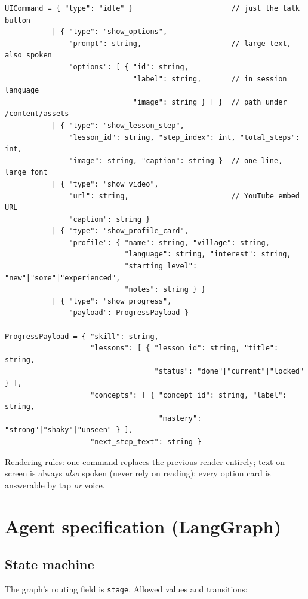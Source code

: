 \documentclass[11pt]{article}
\newcommand{\code}[1]{\texttt{#1}}
\begin{document}
\begin{verbatim}
UICommand = { "type": "idle" }                       // just the talk button
           | { "type": "show_options",
               "prompt": string,                     // large text, also spoken
               "options": [ { "id": string,
                              "label": string,       // in session language
                              "image": string } ] }  // path under /content/assets
           | { "type": "show_lesson_step",
               "lesson_id": string, "step_index": int, "total_steps": int,
               "image": string, "caption": string }  // one line, large font
           | { "type": "show_video",
               "url": string,                        // YouTube embed URL
               "caption": string }
           | { "type": "show_profile_card",
               "profile": { "name": string, "village": string,
                            "language": string, "interest": string,
                            "starting_level": "new"|"some"|"experienced",
                            "notes": string } }
           | { "type": "show_progress",
               "payload": ProgressPayload }

ProgressPayload = { "skill": string,
                    "lessons": [ { "lesson_id": string, "title": string,
                                   "status": "done"|"current"|"locked" } ],
                    "concepts": [ { "concept_id": string, "label": string,
                                    "mastery": "strong"|"shaky"|"unseen" } ],
                    "next_step_text": string }
\end{verbatim}

Rendering rules: one command replaces the previous render entirely; text on screen is always \emph{also} spoken (never rely on reading); every option card is answerable by tap \emph{or} voice.

\section{Agent specification (LangGraph)}
\label{sec:agent}

\subsection{State machine}

The graph's routing field is \code{stage}. Allowed values and transitions:
\end{document}
